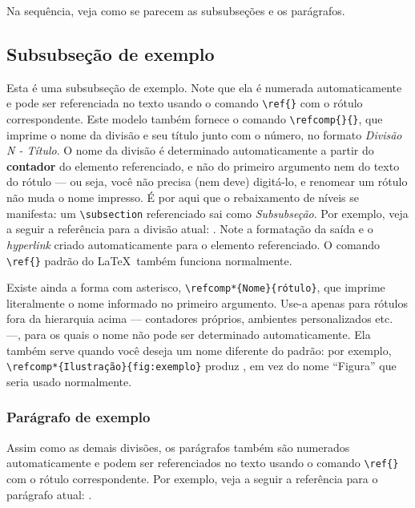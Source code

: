 Na sequência, veja como se parecem as subsubseções e os parágrafos.

\subsection{Subsubseção de exemplo}\label{ssc:exemplo}

Esta é uma subsubseção de exemplo. Note que ela é numerada automaticamente e pode ser
referenciada no texto usando o comando \verb|\ref{}| com o rótulo correspondente. Este modelo
também fornece o comando \verb|\refcomp{}{}|, que imprime o nome da divisão e seu título junto com o
número, no formato \emph{Divisão N - Título}. O nome da divisão é determinado automaticamente a
partir do \textbf{contador} do elemento referenciado, e não do primeiro argumento nem do texto do
rótulo --- ou seja, você não precisa (nem deve) digitá-lo, e renomear um rótulo não muda o nome
impresso. É por aqui que o rebaixamento de níveis se manifesta: um \verb|\subsection| referenciado
sai como \emph{Subsubseção}. Por exemplo, veja a seguir a referência para a divisão atual:
. Note a formatação da saída e o \emph{hyperlink} criado automaticamente para
o elemento referenciado. O comando \verb|\ref{}| padrão do \LaTeX\ também funciona normalmente.

Existe ainda a forma com asterisco, \verb|\refcomp*{Nome}{rótulo}|, que imprime literalmente o nome
informado no primeiro argumento. Use-a apenas para rótulos fora da hierarquia acima --- contadores
próprios, ambientes personalizados etc. ---, para os quais o nome não pode ser determinado
automaticamente. Ela também serve quando você deseja um nome diferente do padrão: por exemplo,
\verb|\refcomp*{Ilustração}{fig:exemplo}| produz , em vez do nome
``Figura'' que seria usado normalmente.

\subsubsection{Parágrafo de exemplo}\label{sss:exemplo}

Assim como as demais divisões, os parágrafos também são numerados automaticamente e podem ser
referenciados no texto usando o comando \verb|\ref{}| com o rótulo correspondente. Por exemplo, veja
a seguir a referência para o parágrafo atual: .

